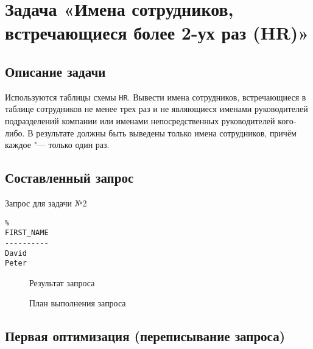 \chapter{Задача «Имена сотрудников, встречающиеся более 2-ух раз (HR)»}


\section{Описание задачи}


Используются таблицы схемы \texttt{HR}. Вывести имена сотрудников, встречающиеся в таблице сотрудников не менее трех раз и не являющиеся именами руководителей подразделений компании или именами непосредственных руководителей кого-либо. В результате должны быть выведены только имена сотрудников, причём каждое "--- только один раз.


\section{Составленный запрос}


\begin{algorithm}[H]
  \caption{Запрос для задачи №2}
  \label{code-task-2}
\end{algorithm}


\begin{samepage}%
  \begin{verbatim}%
FIRST_NAME
----------
David
Peter
  \end{verbatim}
  \begin{figure}[H]%
    \caption{Результат запроса}
    \label{fig-task-2-output}
  \end{figure}
\end{samepage}


\begin{figure}[H]%
  \caption{План выполнения запроса}
  \label{fig-task-2-plan}
\end{figure}


\section{Первая оптимизация (переписывание запроса)}


